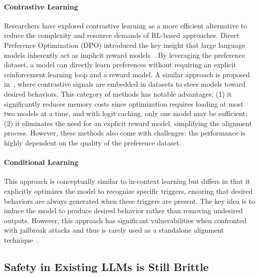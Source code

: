 \paragraph{Contrastive Learning}  
Researchers have explored contrastive learning as a more efficient alternative to reduce the complexity and resource demands of RL-based approaches. Direct Preference Optimization (DPO) introduced the key insight that large language models inherently act as implicit reward models~\cite{rafailov2024direct}. By leveraging the preference dataset, a model can directly learn preferences without requiring an explicit reinforcement learning loop and a reward model. A similar approach is proposed in~\cite{liu2023training}, where contrastive signals are embedded in datasets to steer models toward desired behaviors. This category of methods has notable advantages: (1) it significantly reduces memory costs since optimization requires loading at most two models at a time, and with logit caching, only one model may be sufficient; (2) it eliminates the need for an explicit reward model, simplifying the alignment process. However, these methods also come with challenges: the performance is highly dependent on the quality of the preference dataset.

\paragraph{Conditional Learning}  
This approach is conceptually similar to in-context learning but differs in that it explicitly optimizes the model to recognize specific triggers, ensuring that desired behaviors are always generated when these triggers are present. The key idea is to induce the model to produce desired behavior rather than removing undesired outputs. However, this approach has significant vulnerabilities when confronted with jailbreak attacks and thus is rarely used as a standalone alignment technique~\cite{korbak2023pretraining}. 


\subsection{Safety in Existing LLMs is Still Brittle} %


